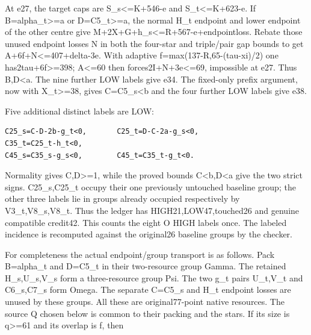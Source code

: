 \documentclass[10pt,a4paper]{article}
\theoremstyle{definition}
\begin{document}
At e27,\allowbreak{} the target caps are S\_\allowbreak{}s\textless=\allowbreak{}K+\allowbreak{}546-e and
S\_\allowbreak{}t\textless=\allowbreak{}K+\allowbreak{}623-e. If B=\allowbreak{}alpha\_\allowbreak{}t\textgreater=\allowbreak{}a or
D=\allowbreak{}C5\_\allowbreak{}t\textgreater=\allowbreak{}a,\allowbreak{} the normal H\_\allowbreak{}t endpoint and lower endpoint of
the other centre give M+\allowbreak{}2X+\allowbreak{}G+\allowbreak{}h\_\allowbreak{}s\textless=\allowbreak{}R+\allowbreak{}567-e+\allowbreak{}endpointloss. Rebate
those unused endpoint losses N in both the four-star and triple/pair gap
bounds to get A+\allowbreak{}6f+\allowbreak{}N\textless=\allowbreak{}407+\allowbreak{}delta-3e. With adaptive
f=\allowbreak{}max(137-R,\allowbreak{}65-(tau-xi)/2) one has2tau+\allowbreak{}6f\textgreater=\allowbreak{}398; A\textless=\allowbreak{}60
then forces2I+\allowbreak{}N+\allowbreak{}3e\textless=\allowbreak{}69,\allowbreak{} impossible at e27. Thus B,\allowbreak{}D\textless a.
The nine further LOW labels give e34. The fixed-only prefix argument,\allowbreak{}
now with X\_\allowbreak{}t\textgreater=\allowbreak{}38,\allowbreak{} gives C=\allowbreak{}C5\_\allowbreak{}s\textless b and the four
further LOW labels give e38.

Five additional distinct labels are LOW:

\begin{lstlisting}
C25_s=C-D-2b-g_t<0,       C25_t=D-C-2a-g_s<0,
C35_t=C25_t-h_t<0,
C45_s=C35_s-g_s<0,        C45_t=C35_t-g_t<0.
\end{lstlisting}

Normality gives C,\allowbreak{}D\textgreater=\allowbreak{}1,\allowbreak{} while the proved bounds
C\textless b,\allowbreak{}D\textless a give the two strict signs. C25\_\allowbreak{}s,\allowbreak{}C25\_\allowbreak{}t
occupy their one previously untouched baseline group; the other three
labels lie in groups already occupied respectively by V3\_\allowbreak{}t,\allowbreak{}V8\_\allowbreak{}s,\allowbreak{}V8\_\allowbreak{}t.
Thus the ledger has HIGH21,\allowbreak{}LOW47,\allowbreak{}touched26 and genuine compatible
credit42. This counts the eight O HIGH labels once. The labeled
incidence is recomputed against the original26 baseline groups by the
checker.

For completeness the actual endpoint/group transport is as follows. Pack
B=\allowbreak{}alpha\_\allowbreak{}t and D=\allowbreak{}C5\_\allowbreak{}t in their two-resource group Gamma. The retained
H\_\allowbreak{}s,\allowbreak{}U\_\allowbreak{}s,\allowbreak{}V\_\allowbreak{}s form a three-resource group Psi. The two g\_\allowbreak{}t pairs
U\_\allowbreak{}t,\allowbreak{}V\_\allowbreak{}t and C6\_\allowbreak{}s,\allowbreak{}C7\_\allowbreak{}s form Omega. The separate C=\allowbreak{}C5\_\allowbreak{}s and H\_\allowbreak{}t
endpoint losses are unused by these groups. All these are
original77-point native resources. The source Q chosen below is common
to their packing and the stars. If its size is q\textgreater=\allowbreak{}61 and its
overlap is f,\allowbreak{} then
\end{document}
